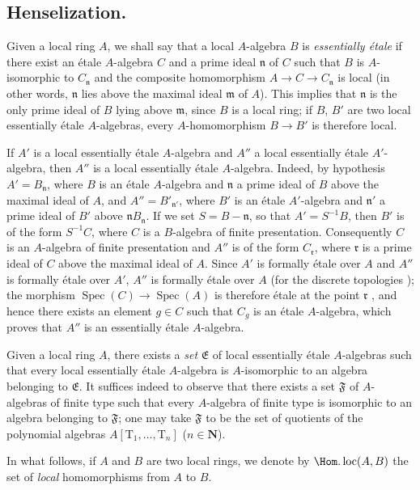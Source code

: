 \subsection{Henselization.}
\label{subsection:IV.18.6}

\begin{env}[18.6.1]
\label{IV.18.6.1}
Given a local ring $A$, we shall say that a local $A$-algebra $B$ is \emph{essentially \'etale} if there exist an \'etale $A$-algebra $C$ and a prime ideal $\mathfrak{n}$ of $C$ such that $B$ is $A$-isomorphic to $C_{\mathfrak{n}}$ and the composite homomorphism $A\to C\to C_{\mathfrak{n}}$ is local (in other words, $\mathfrak{n}$ lies above the maximal ideal $\mathfrak{m}$ of $A$).
This implies  that $\mathfrak{n}$ is the only prime ideal of $B$ lying above $\mathfrak{m}$, since $B$ is a local ring;
if $B$, $B'$ are two local essentially \'etale $A$-algebras, every $A$-homomorphism $B\to B'$ is therefore local.

If $A'$ is a local essentially \'etale $A$-algebra and $A''$ a local essentially \'etale $A'$-algebra, then $A''$ is a local essentially \'etale $A$-algebra.
Indeed, by hypothesis $A'=B_{\mathfrak{n}}$, where $B$ is an \'etale $A$-algebra and $\mathfrak{n}$ a prime ideal of $B$ above the maximal ideal of $A$, and $A''=B'_{\mathfrak{n}'}$, where $B'$ is an \'etale $A'$-algebra and $\mathfrak{n}'$ a prime ideal of $B'$ above $\mathfrak{n}B_{\mathfrak{n}}$.
If we set $S=B-\mathfrak{n}$, so that $A'=S^{-1}B$, then $B'$ is of the form $S^{-1}C$, where $C$ is a $B$-algebra of finite presentation.
Consequently $C$ is an $A$-algebra of finite presentation and $A''$ is of the form $C_{\mathfrak{r}}$, where $\mathfrak{r}$ is a prime ideal of $C$ above the maximal ideal of $A$.
Since $A'$ is formally \'etale over $A$ and $A''$ is formally \'etale over $A'$, $A''$ is formally \'etale over $A$ (for the discrete topologies );
the morphism $\operatorname{Spec}(C)\to\operatorname{Spec}(A)$ is therefore \'etale at the point $\mathfrak{r}$ , and hence there exists an element $g\in C$ such that $C_g$ is an \'etale $A$-algebra, which proves that $A''$ is an essentially \'etale $A$-algebra.

Given a local ring $A$, there exists a \emph{set} $\mathfrak{E}$ of local essentially \'etale $A$-algebras such that every local essentially \'etale $A$-algebra is $A$-isomorphic to an algebra belonging to $\mathfrak{E}$.
It suffices indeed to observe that there exists a set $\mathfrak{F}$ of $A$-algebras of finite type such that every $A$-algebra of finite type is isomorphic to an algebra belonging to $\mathfrak{F}$;
one may take $\mathfrak{F}$ to be the set of quotients of the polynomial algebras $A[\mathrm{T}_1,\ldots,\mathrm{T}_n]$ ($n\in\mathbf{N}$).

In what follows, if $A$ and $B$ are two local rings, we denote by $\Hom.\operatorname{loc}(A,B)$ the set of \emph{local} homomorphisms from $A$ to $B$.
\end{env}

